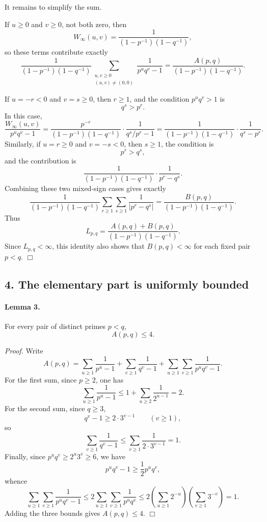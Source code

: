 It remains to simplify the sum.

If \(u\ge 0\) and \(v\ge 0\), not both zero, then
\[
W_{\infty}(u,v)=\frac{1}{(1-p^{-1})(1-q^{-1})},
\]
so these terms contribute exactly
\[
\frac{1}{(1-p^{-1})(1-q^{-1})}
\sum_{\substack{u,v\ge 0\\(u,v)\neq(0,0)}}\frac{1}{p^u q^v-1}
=
\frac{A(p,q)}{(1-p^{-1})(1-q^{-1})}.
\]

If \(u=-r<0\) and \(v=s\ge 0\), then \(r\ge 1\), and the condition \(p^u q^v>1\) is
\[
q^s>p^r.
\]
In this case,
\[
\frac{W_{\infty}(u,v)}{p^u q^v-1}
=
\frac{p^{-r}}{(1-p^{-1})(1-q^{-1})}\cdot \frac{1}{q^s/p^r-1}
=
\frac{1}{(1-p^{-1})(1-q^{-1})}\cdot \frac{1}{q^s-p^r}.
\]
Similarly, if \(u=r\ge 0\) and \(v=-s<0\), then \(s\ge 1\), the condition is
\[
p^r>q^s,
\]
and the contribution is
\[
\frac{1}{(1-p^{-1})(1-q^{-1})}\cdot \frac{1}{p^r-q^s}.
\]
Combining these two mixed-sign cases gives exactly
\[
\frac{1}{(1-p^{-1})(1-q^{-1})}
\sum_{r\ge 1}\sum_{s\ge 1}\frac{1}{|p^r-q^s|}
=
\frac{B(p,q)}{(1-p^{-1})(1-q^{-1})}.
\]
Thus
\[
L_{p,q}=
\frac{A(p,q)+B(p,q)}{(1-p^{-1})(1-q^{-1})}.
\]
Since \(L_{p,q}<\infty\), this identity also shows that \(B(p,q)<\infty\) for each fixed pair \(p<q\).
\hfill\(\Box\)

\subsection*{4. The elementary part is uniformly bounded}

\paragraph{Lemma 3.}
For every pair of distinct primes \(p<q\),
\[
A(p,q)\le 4.
\]

\emph{Proof.}
Write
\[
A(p,q)
=
\sum_{u\ge 1}\frac{1}{p^u-1}
+
\sum_{v\ge 1}\frac{1}{q^v-1}
+
\sum_{u\ge 1}\sum_{v\ge 1}\frac{1}{p^u q^v-1}.
\]
For the first sum, since \(p\ge 2\), one has
\[
\sum_{u\ge 1}\frac{1}{p^u-1}
\le
1+\sum_{u\ge 2}\frac{1}{2^{u-1}}=2.
\]
For the second sum, since \(q\ge 3\),
\[
q^v-1\ge 2\cdot 3^{v-1}
\qquad (v\ge 1),
\]
so
\[
\sum_{v\ge 1}\frac{1}{q^v-1}
\le
\sum_{v\ge 1}\frac{1}{2\cdot 3^{v-1}}=1.
\]
Finally, since \(p^u q^v\ge 2^u 3^v\ge 6\), we have
\[
p^u q^v-1\ge \frac12 p^u q^v,
\]
whence
\[
\sum_{u\ge 1}\sum_{v\ge 1}\frac{1}{p^u q^v-1}
\le
2\sum_{u\ge 1}\sum_{v\ge 1}\frac{1}{p^u q^v}
\le
2\left(\sum_{u\ge 1}2^{-u}\right)\left(\sum_{v\ge 1}3^{-v}\right)=1.
\]
Adding the three bounds gives \(A(p,q)\le 4\).
\hfill\(\Box\)

